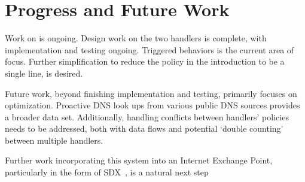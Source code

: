 \section{Progress and Future Work}








Work on \system{} is ongoing. Design work on the two handlers is complete, with implementation and testing ongoing. Triggered behaviors is the current area of focus.  Further simplification to reduce the policy in the introduction to be a single line, is desired.

Future work, beyond finishing implementation and testing, primarily focuses on optimization. Proactive DNS look ups from various public DNS sources provides a broader data set. Additionally, handling conflicts between handlers' policies needs to be addressed, both with data flows and potential `double counting' between multiple handlers.  

Further work incorporating this system into an Internet Exchange Point, particularly in the form of SDX~\cite{sdx}, is a natural next step
